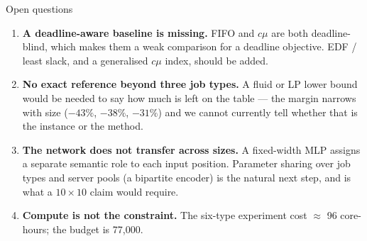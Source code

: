 \documentclass[11pt,aspectratio=169]{beamer}
\begin{document}
\begin{frame}{Open questions}

\begin{enumerate}
  \item \textbf{A deadline-aware baseline is missing.}  FIFO and $c\mu$ are both
  deadline-blind, which makes them a weak comparison for a deadline objective.
  EDF / least slack, and a generalised $c\mu$ index, should be added.

  \vspace{4pt}
  \item \textbf{No exact reference beyond three job types.}  A fluid or LP lower
  bound would be needed to say how much is left on the table --- the margin
  narrows with size ($-43\%$, $-38\%$, $-31\%$) and we cannot currently tell
  whether that is the instance or the method.

  \vspace{4pt}
  \item \textbf{The network does not transfer across sizes.}  A fixed-width MLP
  assigns a separate semantic role to each input position.  Parameter sharing
  over job types and server pools (a bipartite encoder) is the natural next
  step, and is what a $10\times10$ claim would require.

  \vspace{4pt}
  \item \textbf{Compute is not the constraint.}  The six-type experiment cost
  $\approx$ 96 core-hours; the budget is 77{,}000.
\end{enumerate}

\end{frame}
\end{document}
